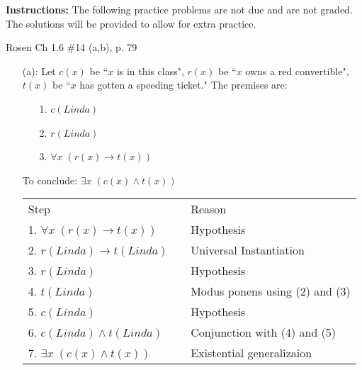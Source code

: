 \documentclass[12pt,addpoints]{exam}
\begin{document}
\extrawidth{0.5in} \extrafootheight{-0in} \pagestyle{headandfoot}
\headrule {} \footrule {}

\noindent \textbf{Instructions:} The following practice problems are
not due and are not graded.  The solutions will be provided to allow
for extra practice.

\begin{questions}
\printanswers


\question Rosen Ch 1.6 \#14 (a,b), p. 79
    \ifprintanswers
        \vspace{-15pt}
    \fi
\begin{solution}
    \begin{itemize}[itemsep=0pt,parsep=0pt,topsep=0pt,partopsep=0pt]
    \item[(a):] Let $c(x)$ be ``$x$ is in this class", $r(x)$ be ``$x$ owns a red convertible", $t(x)$ be ``$x$ has gotten a speeding ticket."  The premises are:
    \begin{itemize}[itemsep=0pt,parsep=0pt,topsep=0pt,partopsep=0pt]
        \item[1.] $c(Linda)$
        \item[2.] $r(Linda)$
        \item[3.] $\forall x\; (r(x) \rightarrow t(x))$
    \end{itemize}
    To conclude: $\exists x\; (c(x) \wedge t(x))$

    \smallskip
    \begin{tabular}{lll}
        Step        & \hspace{0.2in} & Reason \\
        1. $\forall x\; (r(x) \rightarrow t(x))$    &   & Hypothesis \\
        2. $r(Linda) \rightarrow t(Linda)$          &   & Universal Instantiation \\
        3. $r(Linda)$                               &   & Hypothesis \\
        4. $t(Linda)$                               &   & Modus ponens using (2) and (3) \\
        5. $c(Linda)$                               &   & Hypothesis \\
        6. $c(Linda) \wedge t(Linda)$               &   & Conjunction with (4) and (5) \\
        7. $\exists x\; (c(x) \wedge t(x))$         &   & Existential generalizaion \\
    \end{tabular}


\end{itemize}
\end{solution}
\end{questions}
\end{document}
